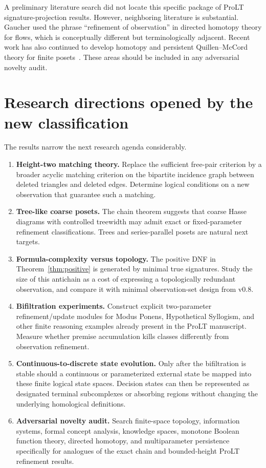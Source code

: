 \documentclass[11pt]{article}
\theoremstyle{definition}
\begin{document}
A preliminary literature search did not locate this specific package of ProLT signature-projection results. However, neighboring literature is substantial. Gaucher used the phrase ``refinement of observation'' in directed homotopy theory for flows, which is conceptually different but terminologically adjacent. Recent work has also continued to develop homotopy and persistent Quillen--McCord theory for finite posets~\cite{GuzeevTanaka2026}. These areas should be included in any adversarial novelty audit.

\section{Research directions opened by the new classification}

The results narrow the next research agenda considerably.

\begin{enumerate}[label=\textbf{P\arabic*.},leftmargin=2.8em]
\item \textbf{Height-two matching theory.} Replace the sufficient free-pair criterion by a broader acyclic matching criterion on the bipartite incidence graph between deleted triangles and deleted edges. Determine logical conditions on a new observation that guarantee such a matching.

\item \textbf{Tree-like coarse posets.} The chain theorem suggests that coarse Hasse diagrams with controlled treewidth may admit exact or fixed-parameter refinement classifications. Trees and series-parallel posets are natural next targets.

\item \textbf{Formula-complexity versus topology.} The positive DNF in Theorem~\ref{thm:positive} is generated by minimal true signatures. Study the size of this antichain as a cost of expressing a topologically redundant observation, and compare it with minimal observation-set design from v0.8.

\item \textbf{Bifiltration experiments.} Construct explicit two-parameter refinement/update modules for Modus Ponens, Hypothetical Syllogism, and other finite reasoning examples already present in the ProLT manuscript. Measure whether premise accumulation kills classes differently from observation refinement.

\item \textbf{Continuous-to-discrete state evolution.} Only after the bifiltration is stable should a continuous or parameterized external state be mapped into these finite logical state spaces. Decision states can then be represented as designated terminal subcomplexes or absorbing regions without changing the underlying homological definitions.

\item \textbf{Adversarial novelty audit.} Search finite-space topology, information systems, formal concept analysis, knowledge spaces, monotone Boolean function theory, directed homotopy, and multiparameter persistence specifically for analogues of the exact chain and bounded-height ProLT refinement results.
\end{enumerate}
\end{document}
